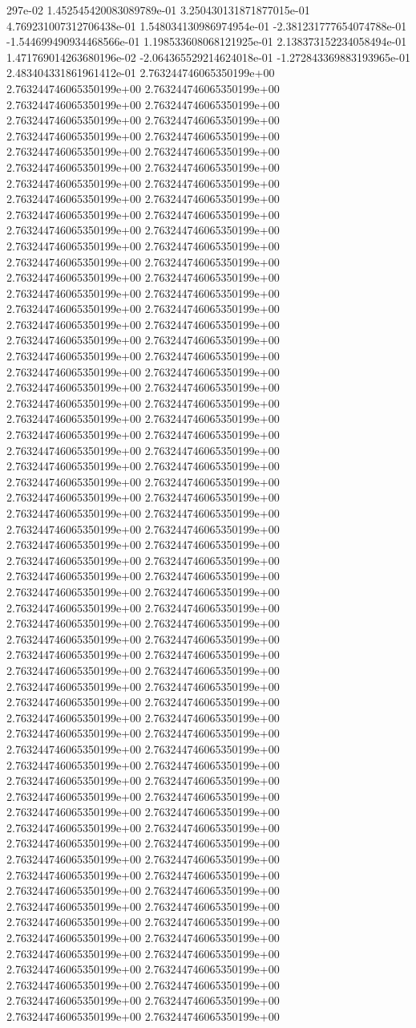 297e-02	1.452545420083089789e-01	3.250430131871877015e-01	4.769231007312706438e-01	1.548034130986974954e-01	-2.381231777654074788e-01	-1.544699490934468566e-01	1.198533608068121925e-01	2.138373152234058494e-01	1.471769014263680196e-02	-2.064365529214624018e-01	-1.272843369883193965e-01	2.483404331861961412e-01
2.763244746065350199e+00	2.763244746065350199e+00	2.763244746065350199e+00	2.763244746065350199e+00	2.763244746065350199e+00	2.763244746065350199e+00	2.763244746065350199e+00	2.763244746065350199e+00	2.763244746065350199e+00	2.763244746065350199e+00	2.763244746065350199e+00	2.763244746065350199e+00	2.763244746065350199e+00	2.763244746065350199e+00	2.763244746065350199e+00	2.763244746065350199e+00	2.763244746065350199e+00	2.763244746065350199e+00	2.763244746065350199e+00	2.763244746065350199e+00	2.763244746065350199e+00	2.763244746065350199e+00	2.763244746065350199e+00	2.763244746065350199e+00	2.763244746065350199e+00	2.763244746065350199e+00	2.763244746065350199e+00	2.763244746065350199e+00	2.763244746065350199e+00	2.763244746065350199e+00	2.763244746065350199e+00	2.763244746065350199e+00	2.763244746065350199e+00	2.763244746065350199e+00	2.763244746065350199e+00	2.763244746065350199e+00	2.763244746065350199e+00	2.763244746065350199e+00	2.763244746065350199e+00	2.763244746065350199e+00	2.763244746065350199e+00	2.763244746065350199e+00	2.763244746065350199e+00	2.763244746065350199e+00	2.763244746065350199e+00	2.763244746065350199e+00	2.763244746065350199e+00	2.763244746065350199e+00	2.763244746065350199e+00	2.763244746065350199e+00	2.763244746065350199e+00	2.763244746065350199e+00	2.763244746065350199e+00	2.763244746065350199e+00	2.763244746065350199e+00	2.763244746065350199e+00	2.763244746065350199e+00	2.763244746065350199e+00	2.763244746065350199e+00	2.763244746065350199e+00	2.763244746065350199e+00	2.763244746065350199e+00	2.763244746065350199e+00	2.763244746065350199e+00	2.763244746065350199e+00	2.763244746065350199e+00	2.763244746065350199e+00	2.763244746065350199e+00	2.763244746065350199e+00	2.763244746065350199e+00	2.763244746065350199e+00	2.763244746065350199e+00	2.763244746065350199e+00	2.763244746065350199e+00	2.763244746065350199e+00	2.763244746065350199e+00	2.763244746065350199e+00	2.763244746065350199e+00	2.763244746065350199e+00	2.763244746065350199e+00	2.763244746065350199e+00	2.763244746065350199e+00	2.763244746065350199e+00	2.763244746065350199e+00	2.763244746065350199e+00	2.763244746065350199e+00	2.763244746065350199e+00	2.763244746065350199e+00	2.763244746065350199e+00	2.763244746065350199e+00	2.763244746065350199e+00	2.763244746065350199e+00	2.763244746065350199e+00	2.763244746065350199e+00	2.763244746065350199e+00	2.763244746065350199e+00	2.763244746065350199e+00	2.763244746065350199e+00	2.763244746065350199e+00	2.763244746065350199e+00	2.763244746065350199e+00	2.763244746065350199e+00	2.763244746065350199e+00	2.763244746065350199e+00	2.763244746065350199e+00	2.763244746065350199e+00	2.763244746065350199e+00	2.763244746065350199e+00	2.763244746065350199e+00	2.763244746065350199e+00	2.763244746065350199e+00	2.763244746065350199e+00	2.763244746065350199e+00	2.763244746065350199e+00	2.763244746065350199e+00	2.763244746065350199e+00	2.763244746065350199e+00	2.763244746065350199e+00	2.763244746065350199e+00	2.763244746065350199e+00	2.763244746065350199e+00